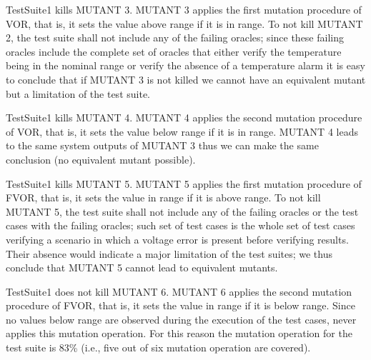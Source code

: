 TestSuite1 kills MUTANT 3. MUTANT 3 applies the first mutation procedure of VOR, that is, it sets the value above range if it is in range. To not kill MUTANT 2, the test suite shall not include any of the failing oracles; since these failing oracles include the complete set of oracles that either verify the temperature being in the nominal range or verify the absence of a temperature alarm it is easy to conclude that if MUTANT 3 is not killed we cannot have an equivalent mutant but a limitation of the test suite.

TestSuite1 kills MUTANT 4. MUTANT 4 applies the second mutation procedure of VOR, that is, it sets the value below range if it is in range. MUTANT 4 leads to the same system outputs of MUTANT 3 thus we can make the same conclusion (no equivalent mutant possible).

TestSuite1 kills MUTANT 5. MUTANT 5 applies the first mutation procedure of FVOR, that is, it sets the value in range if it is above range. 
To not kill MUTANT 5, the test suite shall not include any of the failing oracles or the test cases with the failing oracles; such set of test cases is the whole set of test cases verifying a scenario in which a voltage error is present before verifying results. Their absence would indicate a major limitation of the test suites; we thus conclude that MUTANT 5 cannot lead to equivalent mutants. 

TestSuite1 does not kill MUTANT 6. MUTANT 6 applies the second mutation procedure of FVOR, that is, it sets the value in range if it is below range. Since no values below range are observed during the execution of the test cases, \APPR never applies this mutation operation. For this reason the mutation operation for the test suite is 83\% (i.e., five out of six mutation operation are covered).



